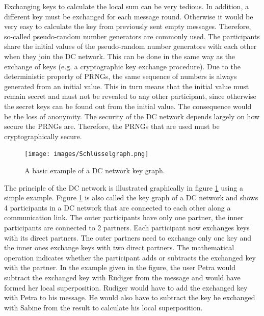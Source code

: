 Exchanging keys to calculate the local sum can be very tedious. In addition, a different key must be exchanged for each message round. Otherwise it would be very easy to calculate the key from previously sent empty messages. Therefore, so-called pseudo-random number generators are commonly used. The participants share the initial values of the pseudo-random number generators with each other when they join the DC network. This can be done in the same way as the exchange of keys (e.g. a cryptographic key exchange procedure). Due to the deterministic property of PRNGs, the same sequence of numbers is always generated from an initial value. This in turn means that the initial value must remain secret and must not be revealed to any other participant, since otherwise the secret keys can be found out from the initial value. The consequence would be the loss of anonymity. The security of the DC network depends largely on how secure the PRNGs are. Therefore, the PRNGs that are used must be cryptographically secure.\\
\begin{figure}[tbp]
  \centering
  \texttt{[image: images/Schlüsselgraph.png]}
  \caption[DC Network Key Graph]{A basic example of a DC network key graph.}
  \label{fig:keygraph}
\end{figure}
The principle of the DC network is illustrated graphically in figure \ref{fig:keygraph} using a simple example. Figure \ref{fig:keygraph} is also called the key graph of a DC network and shows 4 participants in a DC network that are connected to each other along a communication link. The outer participants have only one partner, the inner participants are connected to 2 partners. Each participant now exchanges keys with its direct partners. The outer partners need to exchange only one key and the inner ones exchange keys with two direct partners.
The mathematical operation indicates whether the participant adds or subtracts the exchanged key with the partner. In the example given in the figure, the user Petra would subtract the exchanged key with Rüdiger from the message and would have formed her local superposition. Rudiger would have to add the exchanged key with Petra to his message. He would also have to subtract the key he exchanged with Sabine from the result to calculate his local superposition. 

